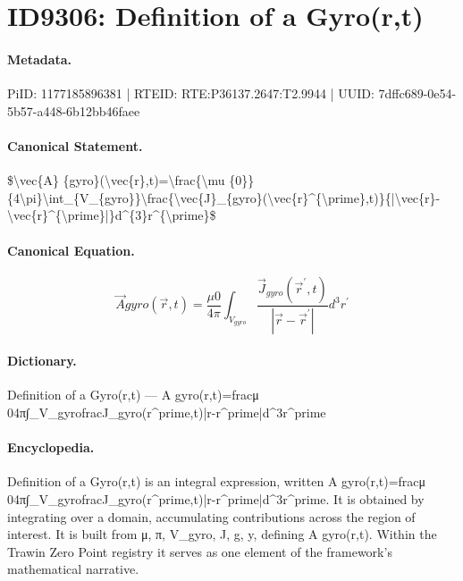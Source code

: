 \section*{ID9306: Definition of a Gyro(r,t)}
\paragraph{Metadata.}
PiID: 1177185896381 | RTEID: RTE:P36137.2647:T2.9944 | UUID: 7dffc689-0e54-5b57-a448-6b12bb46faee

\paragraph{Canonical Statement.}
\$\textbackslash{}vec\{A\} \{gyro\}(\textbackslash{}vec\{r\},t)=\textbackslash{}frac\{\textbackslash{}mu \{0\}\}\{4\textbackslash{}pi\}\textbackslash{}int\_\{V\_\{gyro\}\}\textbackslash{}frac\{\textbackslash{}vec\{J\}\_\{gyro\}(\textbackslash{}vec\{r\}\textasciicircum{}\{\textbackslash{}prime\},t)\}\{|\textbackslash{}vec\{r\}-\textbackslash{}vec\{r\}\textasciicircum{}\{\textbackslash{}prime\}|\}d\textasciicircum{}\{3\}r\textasciicircum{}\{\textbackslash{}prime\}\$

\paragraph{Canonical Equation.}
\[
\vec{A} {gyro}(\vec{r},t)=\frac{\mu {0}}{4\pi}\int_{V_{gyro}}\frac{\vec{J}_{gyro}(\vec{r}^{\prime},t)}{|\vec{r}-\vec{r}^{\prime}|}d^{3}r^{\prime}
\]

\paragraph{Dictionary.}
Definition of a Gyro(r,t) — A gyro(r,t)=fracμ 04π∫\_V\_gyrofracJ\_gyro(r\textasciicircum{}prime,t)|r-r\textasciicircum{}prime|d\textasciicircum{}3r\textasciicircum{}prime

\paragraph{Encyclopedia.}
Definition of a Gyro(r,t) is an integral expression, written A gyro(r,t)=fracμ 04π∫\_V\_gyrofracJ\_gyro(r\textasciicircum{}prime,t)|r-r\textasciicircum{}prime|d\textasciicircum{}3r\textasciicircum{}prime. It is obtained by integrating over a domain, accumulating contributions across the region of interest. It is built from μ, π, V\_gyro, J, g, y, defining A gyro(r,t). Within the Trawin Zero Point registry it serves as one element of the framework's mathematical narrative.
